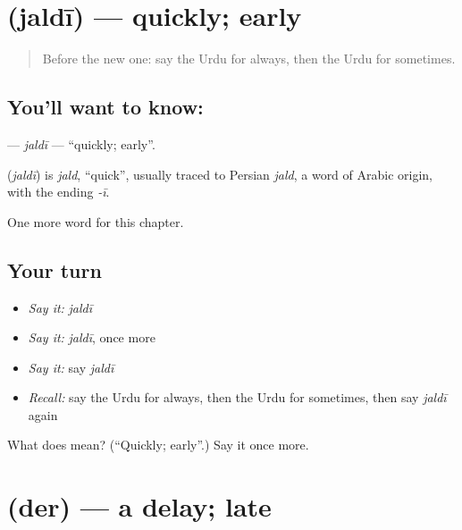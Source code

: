 \section[\texorpdfstring{\ur{جلدی} (jaldī)}{جلدی (jaldī)}]{ (jaldī) — quickly; early}

\label{lesson:UR-C77-jaldi}



\begin{quote}
Before the new one: say the Urdu for always, then the Urdu for sometimes.
\end{quote}

\subsection*{You'll want to know: }
\textbf{} — \emph{jaldī} — \textquotedblleft{}quickly; early\textquotedblright{}.

\begin{cousinweb}
\textbf{} (\emph{jaldī}) is \emph{jald}, \textquotedblleft{}quick\textquotedblright{}, usually traced to Persian \emph{jald}, a word of Arabic origin, with the ending \emph{-ī}.
\end{cousinweb}

\begin{grammarlens}[title={What you've built}]
One more word for this chapter.
\end{grammarlens}

\subsection*{Your turn}
\begin{itemize}
\raggedright
  \item \emph{Say it:} \emph{jaldī}
  \item \emph{Say it:} \emph{jaldī}, once more
  \item \emph{Say it:} say \emph{jaldī}
  \item \emph{Recall:} say the Urdu for always, then the Urdu for sometimes, then say \emph{jaldī} again
\end{itemize}

\begin{tcolorbox}[breakable,colback=teal!4,colframe=teal!35!black,title={Before you move on}]
What does  mean? (\textquotedblleft{}Quickly; early\textquotedblright{}.) Say it once more.
\end{tcolorbox}
\section[\texorpdfstring{\ur{دیر} (der)}{دیر (der)}]{ (der) — a delay; late}

